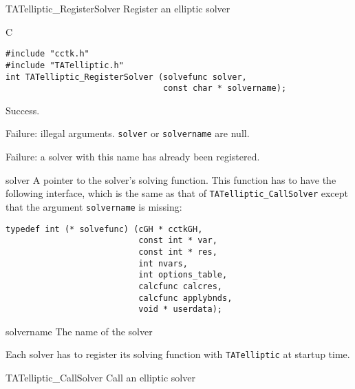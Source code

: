 \begin{FunctionDescription}{TATelliptic\_RegisterSolver}{}
\label{TATelliptic-RegisterSolver}
Register an elliptic solver

\begin{SynopsisSection}
\begin{Synopsis}{C}
\begin{verbatim}
#include "cctk.h"
#include "TATelliptic.h"
int TATelliptic_RegisterSolver (solvefunc solver,
                                const char * solvername);
\end{verbatim}
\end{Synopsis}
\end{SynopsisSection}

\begin{ResultSection}
\begin{Result}{0}
Success.
\end{Result}
\begin{Result}{-1}
Failure: illegal arguments.  \texttt{solver} or \texttt{solvername}
are null.
\end{Result}
\begin{Result}{-2}
Failure: a solver with this name has already been registered.
\end{Result}
\end{ResultSection}

\begin{ParameterSection}
\begin{Parameter}{solver}
A pointer to the solver's solving function.  This function has to have
the following interface, which is the same as that of
\texttt{TATelliptic\_CallSolver} except that the argument
\texttt{solvername} is missing:
\begin{verbatim}
typedef int (* solvefunc) (cGH * cctkGH,
                           const int * var,
                           const int * res,
                           int nvars,
                           int options_table,
                           calcfunc calcres,
                           calcfunc applybnds,
                           void * userdata);
\end{verbatim}
\end{Parameter}
\begin{Parameter}{solvername}
The name of the solver
\end{Parameter}
\end{ParameterSection}

\begin{Discussion}
Each solver has to register its solving function with
\texttt{TATelliptic} at startup time.
\end{Discussion}

\begin{SeeAlsoSection}
\begin{SeeAlso}{TATelliptic\_CallSolver}
Call an elliptic solver
\end{SeeAlso}
\end{SeeAlsoSection}

\end{FunctionDescription}



